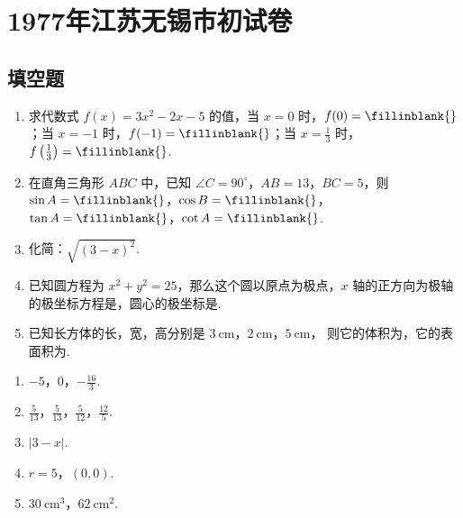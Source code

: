 \chapter{1977年江苏无锡市初试卷}

\section{填空题}

\begin{problem}
\begin{enumerate}
\item 求代数式 \(f(x)=3x^2-2x-5\) 的值，当 \(x=0\) 时，\(f(0)=\fillinblank{}\)；当 \(x=-1\) 时，\(f(-1)=\fillinblank{}\)；当 \(x=\frac{1}{3}\) 时，\(f\left(\frac{1}{3}\right)=\fillinblank{}\).
\item 在直角三角形 \(ABC\) 中，已知 \(\angle C=90^\circ\)，\(AB=13\)，\(BC=5\)，则 \(\sin A=\fillinblank{}\)，\(\cos B=\fillinblank{}\)，\(\tan A=\fillinblank{}\)，\(\cot A=\fillinblank{}\).
\item 化简：\(\sqrt{(3-x)^2}\).
\item 已知圆方程为 \(x^2+y^2=25\)，那么这个圆以原点为极点，\(x\) 轴的正方向为极轴的极坐标方程是\fillinblank{}，圆心的极坐标是\fillinblank{}.
\item 已知长方体的长，宽，高分别是 \(3\mathrm{~cm}\)，\(2\mathrm{~cm}\)，\(5\mathrm{~cm}\)，
则它的体积为\fillinblank{}，它的表面积为\fillinblank{}.
\end{enumerate}
\end{problem}

\begin{answer}
\begin{enumerate}
\item \(-5\)，\(0\)，\(-\frac{16}{3}\).
\item \(\frac{5}{13}\)，\(\frac{5}{13}\)，\(\frac{5}{12}\)，\(\frac{12}{5}\).
\item \(\left|3-x\right|\).
\item \(r=5\)，\((0,0)\).
\item \(30\mathrm{~cm}^3\)，\(62\mathrm{~cm}^2\).
\end{enumerate}
\end{answer}

